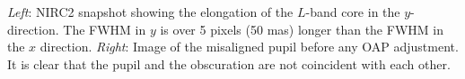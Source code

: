 \textit{Left}: NIRC2 snapshot showing the elongation of the $L$-band core in the $y$-direction. The FWHM in $y$ is over 5 pixels (50 mas) longer than the FWHM in the $x$ direction. \textit{Right}: Image of the misaligned pupil before any OAP adjustment. It is clear that the pupil and the obscuration are not coincident with each other.
\label{fig:inst_misalign}  